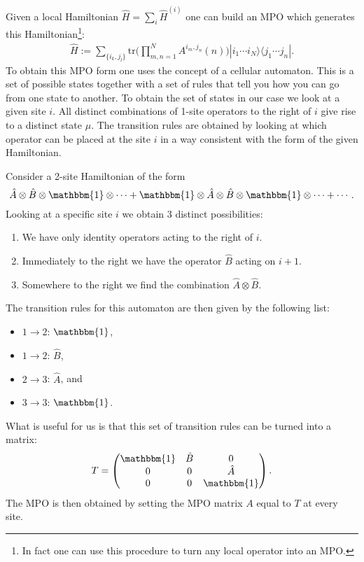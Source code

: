     \begin{method}
        Given a local Hamiltonian $\hat{H}=\sum_i\hat{H}^{(i)}$ one can build an MPO which generates this Hamiltonian\footnote{In fact one can use this procedure to turn any local operator into an MPO.}:
        \begin{gather}
            \hat{H} := \sum_{\{i_k,j_l\}}\text{tr}\Big(\prod_{m,n=1}^NA^{i_m,j_n}(n)\Big)|i_1\cdots i_N\rangle\langle j_1\cdots j_n|.
        \end{gather}
        To obtain this MPO form one uses the concept of a cellular automaton. This is a set of possible states together with a set of rules that tell you how you can go from one state to another. To obtain the set of states in our case we look at a given site $i$. All distinct combinations of 1-site operators to the right of $i$ give rise to a distinct state $\mu$. The transition rules are obtained by looking at which operator can be placed at the site $i$ in a way consistent with the form of the given Hamiltonian.
    \end{method}
    \begin{example}
        Consider a 2-site Hamiltonian of the form \[\hat{A}\otimes\hat{B}\otimes\mathbbm{1}\otimes\cdots+\mathbbm{1}\otimes\hat{A}\otimes\hat{B}\otimes\mathbbm{1}\otimes\cdots+\cdots.\] Looking at a specific site $i$ we obtain 3 distinct possibilities:
        \begin{enumerate}
            \item We have only identity operators acting to the right of $i$.
            \item Immediately to the right we have the operator $\hat{B}$ acting on $i+1$.
            \item Somewhere to the right we find the combination $\hat{A}\otimes\hat{B}$.
        \end{enumerate}
        The transition rules for this automaton are then given by the following list:
        \begin{itemize}
            \item $1\rightarrow2$: $\mathbbm{1}$,
            \item $1\rightarrow2$: $\hat{B}$,
            \item $2\rightarrow3$: $\hat{A}$, and
            \item $3\rightarrow3$: $\mathbbm{1}$.
        \end{itemize}
        What is useful for us is that this set of transition rules can be turned into a matrix: \[T=\begin{pmatrix}\mathbbm{1}&\hat{B}&0\\0&0&\hat{A}\\0&0&\mathbbm{1}\end{pmatrix}.\] The MPO is then obtained by setting the MPO matrix $A$ equal to $T$ at every site.
    \end{example}

